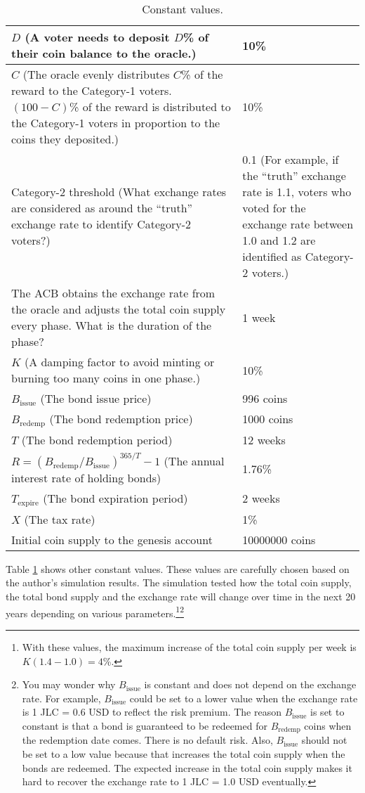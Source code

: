 \documentclass[dvipdfmx,a4paper]{article}
\begin{document}
\begin{table}[htb]
\begin{center}
\caption{Constant values.}\vspace{2ex}
\begin{tabular}{p{26em}|p{10em}}\hline
$D$ (A voter needs to deposit $D$\% of their coin balance to the oracle.) & 10\%\\\hline
$C$ (The oracle evenly distributes $C$\% of the reward to the Category-1 voters. $(100-C)$\% of the reward is distributed to the Category-1 voters in proportion to the coins they deposited.) & 10\%\\\hline
Category-2 threshold (What exchange rates are considered as around the ``truth'' exchange rate to identify Category-2 voters?) & 0.1 (For example, if the ``truth'' exchange rate is 1.1, voters who voted for the exchange rate between 1.0 and 1.2 are identified as Category-2 voters.)\\\hline
The ACB obtains the exchange rate from the oracle and adjusts the total coin supply every phase. What is the duration of the phase? & 1 week\\\hline
$K$ (A damping factor to avoid minting or burning too many coins in one phase.) & 10\%\\\hline
$B_{\mathrm{issue}}$ (The bond issue price) & 996 coins\\\hline
$B_{\mathrm{redemp}}$ (The bond redemption price) & 1000 coins\\\hline
$T$ (The bond redemption period) & 12 weeks\\\hline
$R=(B_{\mathrm{redemp}}/B_{\mathrm{issue}})^{365/T}-1$ (The annual interest rate of holding bonds) & 1.76\%\\\hline
$T_{\mathrm{expire}}$ (The bond expiration period) & 2 weeks\\\hline
$X$ (The tax rate) & 1\%\\\hline
Initial coin supply to the genesis account & 10000000 coins\\\hline
\end{tabular}
\label{table2}
\end{center}
\end{table}

Table \ref{table2} shows other constant values. These values are carefully chosen based on the author's simulation results. The simulation tested how the total coin supply, the total bond supply and the exchange rate will change over time in the next 20 years depending on various parameters.\footnote{With these values, the maximum increase of the total coin supply per week is $K(1.4 - 1.0)=4$\%.}\footnote{You may wonder why $B_{\mathrm{issue}}$ is constant and does not depend on the exchange rate. For example, $B_{\mathrm{issue}}$ could be set to a lower value when the exchange rate is 1 JLC = 0.6 USD to reflect the risk premium. The reason $B_{\mathrm{issue}}$ is set to constant is that a bond is guaranteed to be redeemed for $B_{\mathrm{redemp}}$ coins when the redemption date comes. There is no default risk. Also, $B_{\mathrm{issue}}$ should not be set to a low value because that increases the total coin supply when the bonds are redeemed. The expected increase in the total coin supply makes it hard to recover the exchange rate to 1 JLC = 1.0 USD eventually.}
\end{document}
